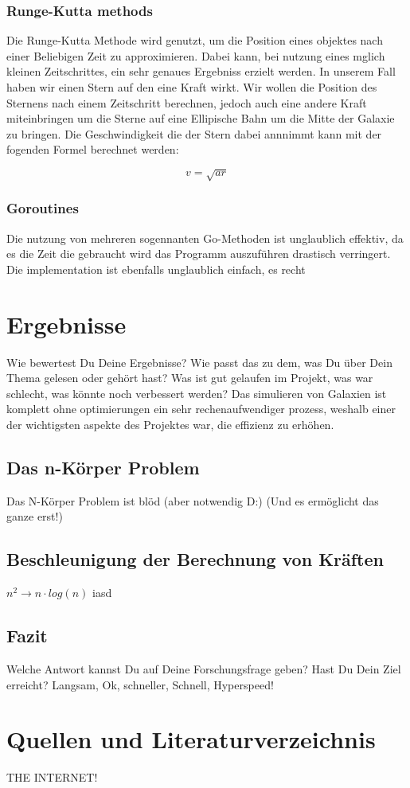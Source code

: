 \documentclass[a4paper, 10pt]{article}
\begin{document}
\begin{multicols*}{2}
\subsubsection{Runge-Kutta methods}
Die Runge-Kutta Methode wird genutzt, um die Position eines objektes nach einer
Beliebigen Zeit zu approximieren. Dabei kann, bei nutzung eines mglich kleinen
Zeitschrittes, ein sehr genaues Ergebniss erzielt werden.  In unserem Fall
haben wir einen Stern auf den eine Kraft wirkt. Wir wollen die Position des
Sternens nach einem Zeitschritt berechnen, jedoch auch eine andere Kraft
miteinbringen um die Sterne auf eine Ellipische Bahn um die Mitte der Galaxie
zu bringen.
Die Geschwindigkeit die der Stern dabei annnimmt kann mit der fogenden Formel
berechnet werden:

\begin{equation}
    v = \sqrt{ar}
\end{equation}

\subsubsection{Goroutines}
Die nutzung von mehreren sogennanten Go-Methoden ist unglaublich effektiv, da
es die Zeit die gebraucht wird das Programm auszuführen drastisch verringert.
Die implementation ist ebenfalls unglaublich einfach, es recht

\section{Ergebnisse}
Wie bewertest Du Deine Ergebnisse? Wie passt das zu dem, was Du über Dein Thema
gelesen oder gehört hast? Was ist gut gelaufen im Projekt, was war schlecht,
was könnte noch verbessert werden?  Das simulieren von Galaxien ist komplett
ohne optimierungen ein sehr rechenaufwendiger prozess, weshalb einer der
wichtigsten aspekte des Projektes war, die effizienz zu erhöhen.

\subsection{Das n-Körper Problem}
Das N-Körper Problem ist blöd (aber notwendig D:) (Und es ermöglicht das ganze
erst!)

\subsection{Beschleunigung der Berechnung von Kräften}
\( n^2 \rightarrow n \cdot log(n) \) 
iasd

\subsection{Fazit}
Welche Antwort kannst Du auf Deine Forschungsfrage geben? Hast Du Dein Ziel
erreicht?  Langsam, Ok, schneller, Schnell, Hyperspeed!


\section{Quellen und Literaturverzeichnis}

THE INTERNET!

\end{multicols*}
\end{document}
